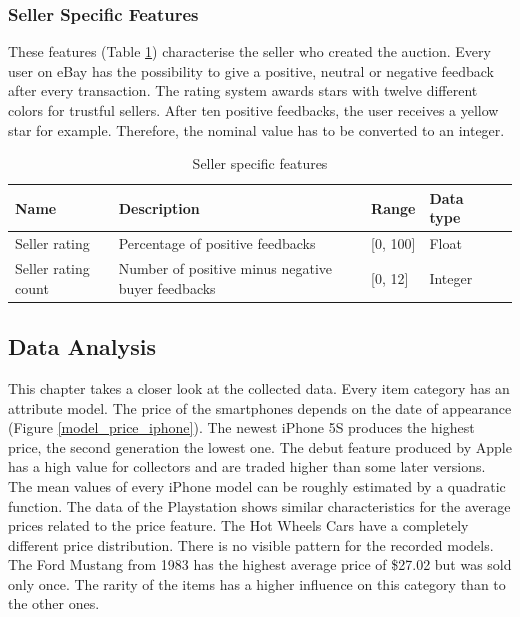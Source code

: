 \subsubsection{Seller Specific Features}
These features (Table \ref{tab:seller_features}) characterise the seller who created the auction. Every user on eBay has the possibility to give a positive, neutral or negative feedback after every transaction. The rating system awards stars with twelve different colors for trustful sellers. After ten positive feedbacks, the user receives a yellow star for example. Therefore, the nominal value has to be converted to an integer.
\begin{table}[h!]
	\begin{center}
	\begin{tabular}{| p{2.6cm} | p{2.6cm} | p{2.6cm} | p{2.6cm} | p{2.6cm} |}
		\hline
		\textbf{Name} & \textbf{Description} &  \textbf{Range} & \textbf{Data type} \\
		\hline
		Seller rating & Percentage of positive feedbacks & [0, 100] & Float \\
		\hline
		Seller rating count & Number of positive minus negative buyer feedbacks & [0, 12] & Integer \\
		\hline
	\end{tabular}
	\end{center}
	\caption{Seller specific features}
	\label{tab:seller_features}
\end{table}
\subsection{Data Analysis}
This chapter takes a closer look at the collected data. Every item category has an attribute model. The price of the smartphones depends on the date of appearance (Figure \ref{model_price_iphone}). The newest iPhone 5S produces the highest price, the second generation the lowest one. The debut feature produced by Apple has a high value for collectors and are traded higher than some later versions. The mean values of every iPhone model can be roughly estimated by a quadratic function. The data of the Playstation shows similar characteristics for the average prices related to the price feature. The Hot Wheels Cars have a completely different price distribution. There is no visible pattern for the recorded models. The Ford Mustang from 1983 has the highest average price of \$27.02 but was sold only once. The rarity of the items has a higher influence on this category than to the other ones.


